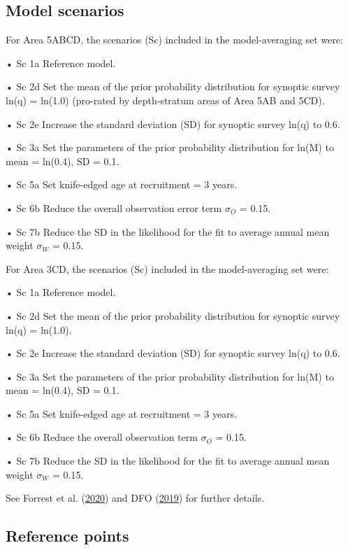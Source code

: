 \documentclass[11pt]{book}
\begin{document}
\hypertarget{model-scenarios}{%
\subsection{Model scenarios}\label{model-scenarios}}

For Area 5ABCD, the scenarios (Sc) included in the model-averaging set were:

• Sc 1a Reference model.

• Sc 2d Set the mean of the prior probability distribution for synoptic survey ln(q) = ln(1.0) (pro-rated by depth-stratum areas of Area 5AB and 5CD).

• Sc 2e Increase the standard deviation (SD) for synoptic survey ln(q) to 0.6.

• Sc 3a Set the parameters of the prior probability distribution for ln(M) to mean = ln(0.4), SD = 0.1.

• Sc 5a Set knife-edged age at recruitment = 3 years.

• Sc 6b Reduce the overall observation error term \(\sigma_O\) = 0.15.

• Sc 7b Reduce the SD in the likelihood for the fit to average annual mean weight \(\sigma_W\) = 0.15.

For Area 3CD, the scenarios (Sc) included in the model-averaging set were:

• Sc 1a Reference model.

• Sc 2d Set the mean of the prior probability distribution for synoptic survey ln(q) = ln(1.0).

• Sc 2e Increase the standard deviation (SD) for synoptic survey ln(q) to 0.6.

• Sc 3a Set the parameters of the prior probability distribution for ln(M) to mean = ln(0.4), SD = 0.1.

• Sc 5a Set knife-edged age at recruitment = 3 years.

• Sc 6b Reduce the overall observation term \(\sigma_O\) = 0.15.

• Sc 7b Reduce the SD in the likelihood for the fit to average annual mean weight \(\sigma_W\) = 0.15.

See Forrest et al. (\protect\hyperlink{ref-forrest2020}{2020}) and DFO (\protect\hyperlink{ref-dfo2019}{2019}) for further details.

\hypertarget{reference-points}{%
\subsection{Reference points}\label{reference-points}}
\end{document}
